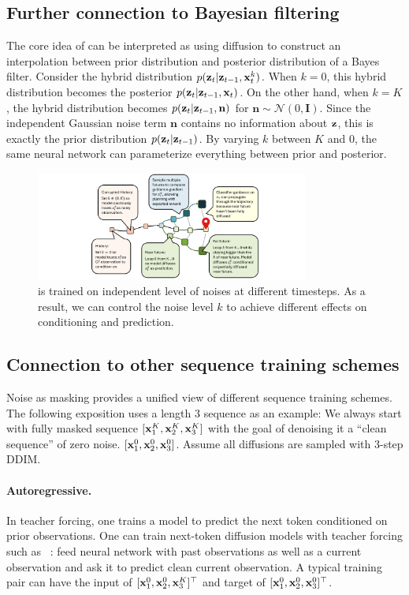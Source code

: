 \subsection{Further connection to Bayesian filtering}
The core idea of \algo{} can be interpreted as using diffusion to construct an interpolation between prior distribution and posterior distribution of a Bayes filter. Consider the hybrid distribution $p(\mathbf{z}_t|\mathbf{z}_{t-1}, \mathbf{x}_t^k)$. When $k=0$, this hybrid distribution becomes the posterior $p(\mathbf{z}_t|\mathbf{z}_{t-1}, \mathbf{x}_t)$. On the other hand, when $k=K$, the hybrid distribution becomes $p(\mathbf{z}_t|\mathbf{z}_{t-1}, \mathbf{n})$ for $ \mathbf{n}\sim \mathcal{N}(0, \mathbf{I})$. Since the independent Gaussian noise term $ \mathbf{n}$ contains no information about $ \mathbf{z}$, this is exactly the prior distribution $p(\mathbf{z}_t|\mathbf{z}_{t-1})$. By varying $k$ between $K$ and $0$, the same neural network can parameterize everything between prior and posterior.

\begin{figure}
    \centering
    \includegraphics[width=0.8\textwidth]{figures/ability_in_sequence.pdf}
    \caption{\algo{} is trained on independent level of noises at different timesteps. As a result, we can control the noise level $k$ to achieve different effects on conditioning and prediction.}
    \label{fig:ability_in_seq}
\end{figure}

\subsection{Connection to other sequence training schemes}
Noise as masking provides a unified view of different sequence training schemes. The following exposition uses a length $3$ sequence as an example: We always start with fully masked sequence $[\mathbf{x}_1^K,\mathbf{x}_2^K,\mathbf{x}_3^K]$ with the goal of denoising it a ``clean sequence'' of zero noise. $[\mathbf{x}_1^0,\mathbf{x}_2^0,\mathbf{x}_3^0]$. Assume all diffusions are sampled with $3$-step DDIM.

\paragraph{Autoregressive.} In teacher forcing, one trains a model to predict the next token conditioned on prior observations. One can train next-token diffusion models with teacher forcing such as ~\cite{rasul2021autoregressive}: feed neural network with past observations as well as a current observation and ask it to predict clean current observation. A typical training pair can have the input of $[\mathbf{x}_1^0,\mathbf{x}_2^0,\mathbf{x}_3^{K}]^\top$ and target of $[\mathbf{x}_1^0,\mathbf{x}_2^0,\mathbf{x}_3^{0}]^\top$.


